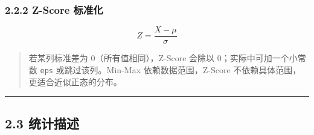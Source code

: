 \subsubsection{2.2.2 Z-Score 标准化}\label{z-score-ux6807ux51c6ux5316}

\[
Z = \frac{X - \mu}{\sigma}
\]

\begin{Shaded}
\begin{Highlighting}[]
\NormalTok{df[}\NormalTok{] }\OperatorTok{=}\NormalTok{ (df[}\NormalTok{] }\OperatorTok{{-}}\NormalTok{ df[}\NormalTok{].mean()) }\OperatorTok{/}\NormalTok{ df[}\NormalTok{].std()}
\NormalTok{(}\NormalTok{, df[}\NormalTok{].mean(), }\NormalTok{, df[}\NormalTok{].std())}
\end{Highlighting}
\end{Shaded}

\begin{Shaded}
\begin{Highlighting}[]
\end{Highlighting}
\end{Shaded}

\begin{quote}
若某列标准差为 0（所有值相同），Z-Score 会除以 0；实际中可加一个小常数
\texttt{eps} 或跳过该列。Min-Max 依赖数据范围，Z-Score
不依赖具体范围，更适合近似正态的分布。
\end{quote}

\begin{center}\rule{0.5\linewidth}{0.5pt}\end{center}

\subsection{2.3 统计描述}\label{ux7edfux8ba1ux63cfux8ff0}

